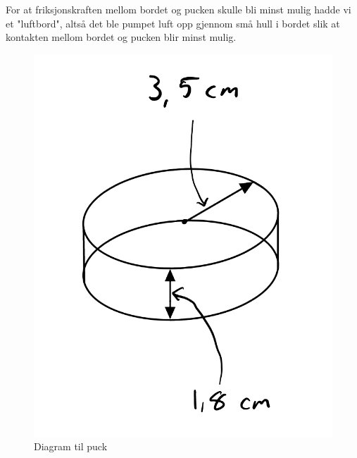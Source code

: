 \documentclass{article}
\begin{document}
For at friksjonskraften mellom bordet og pucken skulle bli minst mulig hadde vi et "luftbord", altså det ble pumpet luft opp gjennom små hull i bordet slik at kontakten mellom bordet og pucken blir minst mulig.

\begin{figure}[h!]
    \centering
    \includegraphics[width=\textwidth]{./images/puck.jpg}
    \caption{Diagram til puck}
\end{figure}
\end{document}
